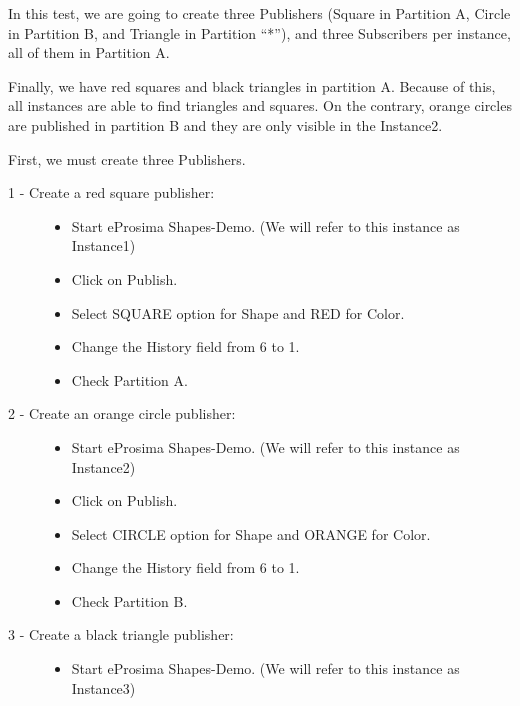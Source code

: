 \documentclass[letterpaper,10pt,english]{sphinxmanual}
\begin{document}
In this test, we are going to create three Publishers (Square in Partition A, Circle in Partition B, and Triangle in Partition “*”), and three Subscribers per instance, all of them in Partition A.

Finally, we have red squares and black triangles in partition A. Because of this, all instances are able to find triangles and squares. On the  contrary, orange circles are published in partition B and they are only visible in the Instance2.


First, we must create three Publishers.
\begin{description}
\item[{1 - Create a red square publisher:}] \leavevmode\begin{itemize}
\item {} 
Start eProsima Shapes-Demo. (We will refer to this instance as Instance1)

\item {} 
Click on Publish.

\item {} 
Select SQUARE option for Shape and RED for Color.

\item {} 
Change the History field from 6 to 1.

\item {} 
Check Partition A.

\end{itemize}

\item[{2 - Create an orange circle publisher:}] \leavevmode\begin{itemize}
\item {} 
Start eProsima Shapes-Demo. (We will refer to this instance as Instance2)

\item {} 
Click on Publish.

\item {} 
Select CIRCLE option for Shape and ORANGE for Color.

\item {} 
Change the History field from 6 to 1.

\item {} 
Check Partition B.

\end{itemize}

\item[{3 - Create a black triangle publisher:}] \leavevmode\begin{itemize}
\item {} 
Start eProsima Shapes-Demo. (We will refer to this instance as Instance3)


\end{itemize}
\end{description}
\end{document}
